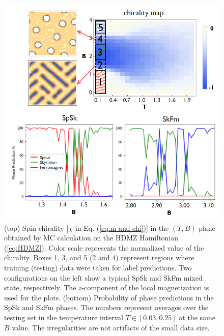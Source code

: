 \documentclass[reprint,amsmath,amssymb,aps,showpacs,superscriptaddress,prl]{revtex4-1}
\begin{document}
\begin{figure}[h]
\includegraphics[scale=0.5]{fig2.png}
\caption{(top) Spin chirality [$\chi$ in Eq. (\ref{eq:m-and-chi})] in the $(T,B)$ plane obtained by MC calculation on the HDMZ Hamiltonian (\ref{eq:HDMZ}). Color scale represents the normalized value of the chirality. Boxes 1, 3, and 5 (2 and 4) represent regions where training (testing) data were taken for label predictions. Two configurations on the left show a typical SpSk and SkFm mixed state, respectively. The $z$-component of the local magnetization is used for the plots. (bottom) Probability of phase predictions in the SpSk and SkFm phases. The numbers represent averages over the testing set in the temperature interval $T\in[0.03,0.25]$ at the same $B$ value. The irregularities are not artifacts of the small data size.}\label{fig:1}
\end{figure}
\end{document}

